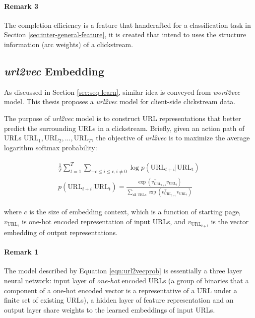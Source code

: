 \paragraph{Remark 3} The completion efficiency is a feature that handcrafted 
for a classification task in Section \ref{sec:inter-general-feature}, 
it is created that intend to uses the structure information (arc weights) of a clickstream.

\subsection{\emph{url2vec} Embedding}

As discussed in Section \ref{sec:seq-learn}, similar idea is conveyed from \emph{word2vec} model.
This thesis proposes a \emph{url2vec} model for client-side clickstream data.

The purpose of \emph{url2vec} model is to construct URL representations that better predict 
the surrounding URLs in a clickstream. Briefly, given an action path of URLs 
$\text{URL}_1, \text{URL}_2, ..., \text{URL}_T$, the objective of \emph{url2vec} is to maximize 
the average logarithm softmax probability:

\begin{align}
\label{eqn:url2vecprob}
\begin{split}
    \frac{1}{T}\sum^{T}_{t=1}\sum_{-c \leq i \leq c, i \neq 0} {\log{p(\text{URL}_{t+i} | \text{URL}_t)}}\\
    p(\text{URL}_{t+i} | \text{URL}_t) = \frac{
        \exp{(v_{\text{URL}_{t+i}} ^\top v_{\text{URL}_t})}
    }{
        \sum_{\text{all URLs}} {\exp{(v_{\text{URL}_{t+i}} ^\top v_{\text{URL}_t})}}
    }
\end{split}
\end{align}

where $c$ is the size of embedding context, which is a function of starting page,
$v_{\text{URL}_t}$ is one-hot encoded representation of input URLs, and 
$v_{\text{URL}_{t+i}}$ is the vector embedding of output representations.

\paragraph{Remark 1} The model described by Equation \ref{eqn:url2vecprob} is essentially
a three layer neural network: input layer of \emph{one-hot} encoded URLs (a group of binaries
that a component of a one-hot encoded vector is a representative of a URL under a finite set
of existing URLs), a hidden layer of feature representation and an output layer 
share weights to the learned embeddings of input URLs.

